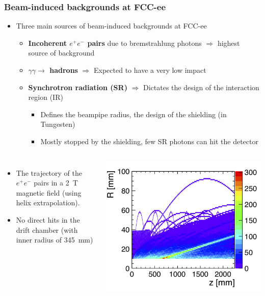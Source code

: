 \documentclass[aspectratio=169, hyperref={colorlinks=true,pdfpagelabels=false,linkcolor=black}, xcolor=dvipsnames,10pt]{beamer}
\begin{document}
\begin{frame}
  \frametitle{Beam-induced backgrounds at FCC-ee}

  \begin{itemize}
    \item Three main sources of beam-induced backgrounds at FCC-ee
    \begin{itemize}
      \item \textbf{Incoherent $e^+e^-$ pairs} due to bremstrahlung photons $\Rightarrow$ highest source of background
      \item \textbf{$\gamma\gamma\rightarrow$ hadrons} $\Rightarrow$ Expected to have a very low impact
      \item \textbf{Synchrotron radiation (SR)} $\Rightarrow$ Dictates the design of the interaction region (IR)
        \begin{itemize}
          \item Defines the beampipe radius, the design of the shielding (in Tungesten)
          \item Mostly stopped by the shielding, few SR photons can hit the detector
        \end{itemize}
    \end{itemize}
  \end{itemize}

  \begin{columns}
      \begin{itemize}
        \item The trajectory of the $e^+e^-$ pairs in a 2~T magnetic field (using helix extrapolation).

        \item No direct hits in the drift chamber (with inner radius of 345~mm)
      \end{itemize}

      \centering
      \includegraphics[width=\textwidth]{./figures/pairs_R_Z}

    \end{columns}

\end{frame}
\end{document}
